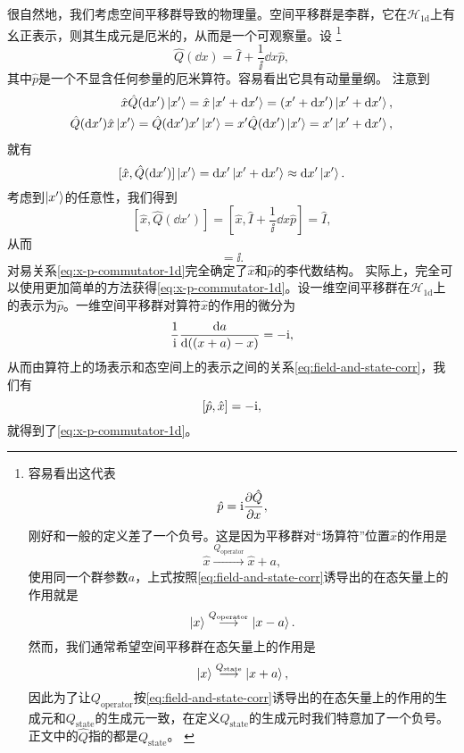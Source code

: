 很自然地，我们考虑空间平移群导致的物理量。空间平移群是李群，它在$\mathcal{H}_{1\text{d}}$上有幺正表示，则其生成元是厄米的，从而是一个可观察量。设%
\footnote{容易看出这代表
\[
    \hat{p} = \mathrm{i} \pdv{\hat{Q}}{x},
\]
刚好和一般的定义差了一个负号。这是因为平移群对“场算符”位置$\hat{x}$的作用是
\[
    \hat{x} \stackrel{Q_\text{operator}}{\longrightarrow} \hat{x} + a,
\]
使用同一个群参数$a$，上式按照\eqref{eq:field-and-state-corr}诱导出的在态矢量上的作用就是
\[
    \ket{x} \stackrel{Q_\text{operator}}{\longrightarrow} \ket{x - a}.
\]
然而，我们通常希望空间平移群在态矢量上的作用是
\[
    \ket{x} \stackrel{Q_\text{state}}{\longrightarrow} \ket{x + a},
\]
因此为了让$Q_\text{operator}$按\eqref{eq:field-and-state-corr}诱导出的在态矢量上的作用的生成元和$Q_\text{state}$的生成元一致，在定义$Q_\text{state}$的生成元时我们特意加了一个负号。正文中的$\hat{Q}$指的都是$Q_\text{state}$。
\label{note:state-and-operator-minus-symbol}}
\begin{equation}
    \hat{Q}(\dd{x}) = \hat{I} + \frac{1}{\ii} \dd{x} \hat{p},
\end{equation}
其中$\hat{p}$是一个不显含任何参量的厄米算符。容易看出它具有动量量纲。
注意到
\[
    \begin{split}
        \hat{x} \hat{Q}(\dd{x'}) \ket{x'} = \hat{x} \ket{x' + \dd{x'}} = (x' + \dd{x'}) \ket{x' + \dd{x'}}, \\
        \hat{Q}(\dd{x'}) \hat{x} \ket{x'} = \hat{Q}(\dd{x'}) x' \ket{x'} = x' \hat{Q}(\dd{x'}) \ket{x'} = x' \ket{x' + \dd{x'}},
    \end{split}
\]
就有
\[
    [\hat{x}, \hat{Q}(\dd{x'})] \ket{x'} = \dd{x'} \ket{x' + \dd{x'}} \approx \dd{x'} \ket{x'}.
\]
考虑到$\ket{x'}$的任意性，我们得到
\[
    [\hat{x}, \hat{Q}(\dd{x'})] = \left[\hat{x}, \hat{I} + \frac{1}{\ii} \dd{x} \hat{p}\right] = \hat{I},
\]
从而
\begin{equation}
    [\hat{x}, \hat{p}] = \ii . 
    \label{eq:x-p-commutator-1d}   
\end{equation}
对易关系\eqref{eq:x-p-commutator-1d}完全确定了$\hat{x}$和$\hat{p}$的李代数结构。
实际上，完全可以使用更加简单的方法获得\eqref{eq:x-p-commutator-1d}。设一维空间平移群在$\mathcal{H}_\text{1d}$上的表示为$\hat{p}$。一维空间平移群对算符$\hat{x}$的作用的微分为
\[
    \frac{1}{\mathrm{i}} \dv{a} {((x + a) - x)} = - \mathrm{i},
\]
从而由算符上的场表示和态空间上的表示之间的关系\eqref{eq:field-and-state-corr}，我们有
\[
    \comm{\hat{p}}{\hat{x}} = - \ii,
\]
就得到了\eqref{eq:x-p-commutator-1d}。

